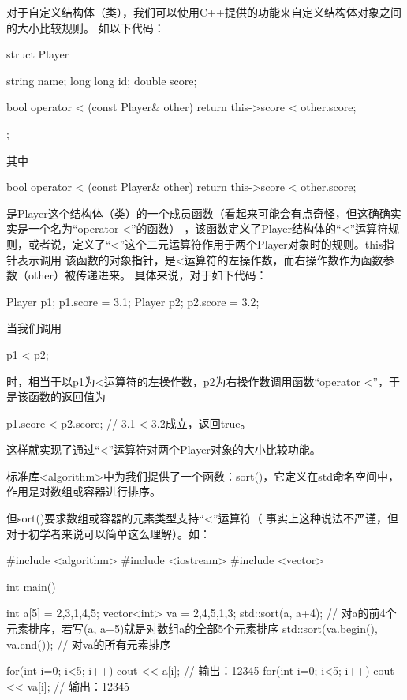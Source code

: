 对于自定义结构体（类），我们可以使用C++提供的功能来自定义结构体对象之间的大小比较规则。
如以下代码：
\begin{cppcode}
    struct Player {
        string name;
        long long id;
        double score;   

        bool operator < (const Player& other) {
            return this->score < other.score;
        }
    };
\end{cppcode}
其中
\begin{cppcode}
    bool operator < (const Player& other) {
        return this->score < other.score;
    }
\end{cppcode}
是Player这个结构体（类）的一个成员函数（看起来可能会有点奇怪，但这确确实实是一个名为“operator <”的函数）
，该函数定义了Player结构体的“<”运算符规则，或者说，定义了“<”这个二元运算符作用于两个Player对象时的规则。this指针表示调用
该函数的对象指针，是<运算符的左操作数，而右操作数作为函数参数（other）被传递进来。
具体来说，对于如下代码：
\begin{cppcode}
    Player p1; p1.score = 3.1;
    Player p2; p2.score = 3.2;
\end{cppcode}
当我们调用
\begin{cppcode}
    p1 < p2;
\end{cppcode}
时，相当于以p1为<运算符的左操作数，p2为右操作数调用函数“operator <”，于是该函数的返回值为
\begin{cppcode}
    p1.score < p2.score; // 3.1 < 3.2成立，返回true。
\end{cppcode}

这样就实现了通过“<”运算符对两个Player对象的大小比较功能。

标准库<algorithm>中为我们提供了一个函数：sort()，它定义在std命名空间中，作用是对数组或容器进行排序。

但sort()要求数组或容器的元素类型支持“<”运算符（
事实上这种说法不严谨，但对于初学者来说可以简单这么理解）。如：
\begin{cppcode}
    #include <algorithm>
    #include <iostream>
    #include <vector>

    int main() {
        int a[5] = {2,3,1,4,5};
        vector<int> va = {2,4,5,1,3};
        std::sort(a, a+4);  // 对a的前4个元素排序，若写(a, a+5)就是对数组a的全部5个元素排序
        std::sort(va.begin(), va.end());    // 对va的所有元素排序

        for(int i=0; i<5; i++) {
            cout << a[i];
        }   // 输出：12345
        for(int i=0; i<5; i++) {
            cout << va[i];
        }   // 输出：12345
    }
\end{cppcode}

